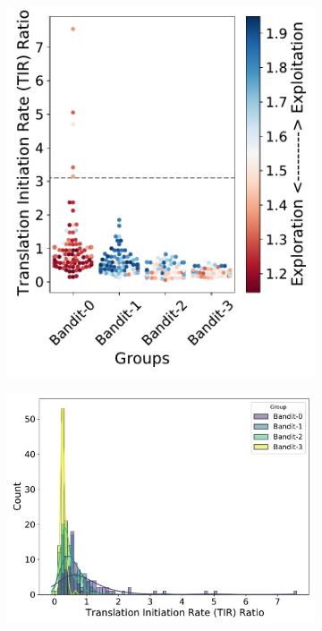 \begin{figure}[!ht]
\begin{subfigure}[b]{0.25\textwidth}
    \end{subfigure}
    \begin{subfigure}[b]{0.25\textwidth}
        \centering
        \caption{}
        \includegraphics[scale=0.35]{plots/Supplementary/swarmplot_proj_salis.pdf}
    \end{subfigure}
    \begin{subfigure}[b]{0.48\textwidth}
        \centering
        \caption{}
        \includegraphics[scale=0.4]{plots/Supplementary/histogram_salis.pdf}

\end{subfigure}
\end{figure}
